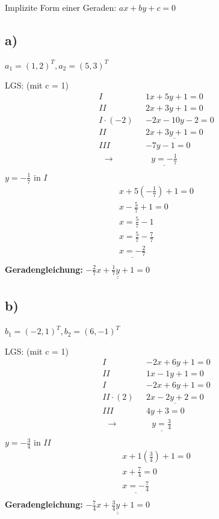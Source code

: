 \documentclass{article}
\begin{document}
Implizite Form einer Geraden: $ax + by +c = 0$

\subsection*{a)}
$a_1 = (1,2)^T, a_2 = (5,3)^T$

LGS: (mit c = 1)
\begin{align*}
    I \ \ \ & 1x + 5y + 1 = 0 \\
    II \ \ \ & 2x + 3y + 1 = 0 \\
    I \cdot (-2) \ \ \ & -2x - 10y - 2 = 0\\
    II \ \ \ & \underline{ 2x + 3y + 1= 0} \\
    III \ \ \ & -7y - 1 = 0 \\
    \ \ \ \rightarrow & \ \ \ \underline{y = -\frac{1}{7}} \\
\end{align*}
$y = -\frac{1}{7}$ in $I$
\begin{align*}
    x + 5(-\frac{1}{7}) + 1 = 0 \\
    x - \frac{5}{7} + 1 = 0 \\
    x = \frac{5}{7} - 1 \\
    x = \frac{5}{7} - \frac{7}{7} \\
    \underline{x = -\frac{2}{7}} \\
\end{align*}
\textbf{Geradengleichung:} $\underline{\underline{-\frac{2}{7}x + \frac{1}{7}y + 1= 0}}$

\subsection*{b)}
$b_1 = (-2,1)^T, b_2 = (6,-1)^T$

LGS: (mit c = 1)
\begin{align*}
    I \ \ \ & -2x + 6y + 1 = 0 \\
    II \ \ \ & 1x - 1y + 1 = 0 \\
    I  \ \ \ & -2x + 6y + 1 = 0\\
    II \cdot (2)\ \ \ & \underline{ 2x - 2y + 2= 0} \\
    III \ \ \ & 4y + 3 = 0 \\
    \ \ \ \rightarrow & \ \ \ \underline{y = \frac{3}{4}} \\
\end{align*}
$y = -\frac{3}{4}$ in $II$
\begin{align*}
    x + 1(\frac{3}{4}) + 1 = 0 \\
    x + \frac{7}{4} = 0 \\
    \underline{x = -\frac{7}{4}} \\
\end{align*}
\textbf{Geradengleichung:} $\underline{\underline{-\frac{7}{4}x + \frac{3}{4}y + 1 = 0}}$
\end{document}
